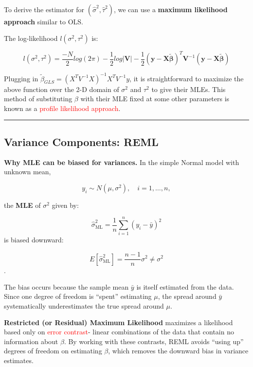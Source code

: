 \documentclass[
  letterpaper,
  DIV=11,
  numbers=noendperiod]{scrreprt}
\begin{document}
To derive the estimator for \((\hat{\sigma}^2, \hat{\tau}^2)\), we can
use a \textbf{maximum likelihood approach} similar to OLS.

The log-likelihood \(l(\sigma^2, \tau^2)\) is:

\[
l(\sigma^2, \tau^2) = \frac{-N}{2} log(2\pi) - \frac{1}{2} log|\mathbf{V}| - \frac{1}{2} (\mathbf{y} - \mathbf{X}\mathbf{\tilde{\beta}})^T\mathbf{V}^{-1} (\mathbf{y} - \mathbf{X}\mathbf{\tilde{\beta}})
\]

Plugging in \(\tilde{\beta}_{GLS} = (X^T V^{-1} X)^{-1}X^T V^{-1}y\), it
is straightforward to maximize the above function over the 2-D domain of
\(\sigma^2\) and \(\tau^2\) to give their MLEs. This method of
substituting \(\beta\) with their MLE fixed at some other parameters is
known as a \textcolor{red}{profile likelihood approach}.

\begin{center}\rule{0.5\linewidth}{0.5pt}\end{center}

\hypertarget{variance-components-reml}{%
\subsection*{Variance Components: REML}\label{variance-components-reml}}

\textbf{Why MLE can be biased for variances.} In the simple Normal model
with unknown mean,

\[
  y_i \sim N(\mu,\sigma^2),\quad i=1,\dots,n,
\]

the \textbf{MLE} of \(\sigma^2\) given by:

\[
  \hat\sigma^2_{\text{ML}}=\frac{1}{n}\sum_{i=1}^n (y_i-\bar y)^2
\] is biased downward:

\[E[\hat\sigma^2_{\text{ML}}]=\frac{n-1}{n}\sigma^2\neq\sigma^2\].

The bias occurs because the sample mean \(\bar{y}\) is itself estimated
from the data. Since one degree of freedom is ``spent'' estimating
\(\mu\), the spread around \(\bar{y}\) systematically underestimates the
true spread around \(\mu\).

\textbf{Restricted (or Residual) Maximum Likelihood} maximizes a
likelihood based only on \textcolor{red}{error contrast}- linear
combinations of the data that contain no information about \(\beta\). By
working with these contrasts, REML avoids ``using up'' degrees of
freedom on estimating \(\beta\), which removes the downward bias in
variance estimates.
\end{document}
